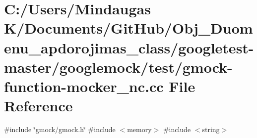 \hypertarget{googletest-master_2googlemock_2test_2gmock-function-mocker__nc_8cc}{}\section{C\+:/\+Users/\+Mindaugas K/\+Documents/\+Git\+Hub/\+Obj\+\_\+\+Duomenu\+\_\+apdorojimas\+\_\+class/googletest-\/master/googlemock/test/gmock-\/function-\/mocker\+\_\+nc.cc File Reference}
\label{googletest-master_2googlemock_2test_2gmock-function-mocker__nc_8cc}
{\ttfamily \#include \char`\"{}gmock/gmock.\+h\char`\"{}}\newline
{\ttfamily \#include $<$memory$>$}\newline
{\ttfamily \#include $<$string$>$}\newline
